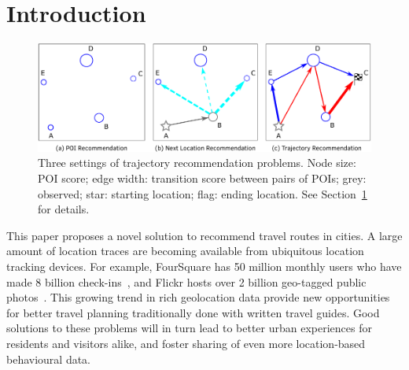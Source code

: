 
\secmoveup
\section{Introduction}
\label{sec:intro}

\begin{figure}[t]
	\centering
	\includegraphics[width=\columnwidth]{fig/fig1-flavours.pdf}
	\caption{Three settings of trajectory recommendation problems.
Node size: POI score; edge width: transition score between pairs of POIs;
grey: observed;
star: starting location; flag: ending location. See Section~\ref{sec:intro} for details.
}
	\label{fig:threesettings}\captionmoveup
\end{figure}


This paper proposes a novel solution to recommend travel routes in cities.
A large amount of location traces are becoming available from ubiquitous location tracking devices.
For example, FourSquare
has 50 million monthly users who have made 8 billion check-ins~\cite{4sq},
and Flickr
hosts over 2 billion geo-tagged public photos~\cite{flickr}.
This growing trend in rich geolocation data
provide new opportunities for better
travel planning traditionally done with written travel guides.
Good solutions to these problems will in turn lead to better urban experiences for residents and visitors alike, and foster sharing of even more location-based behavioural data.
